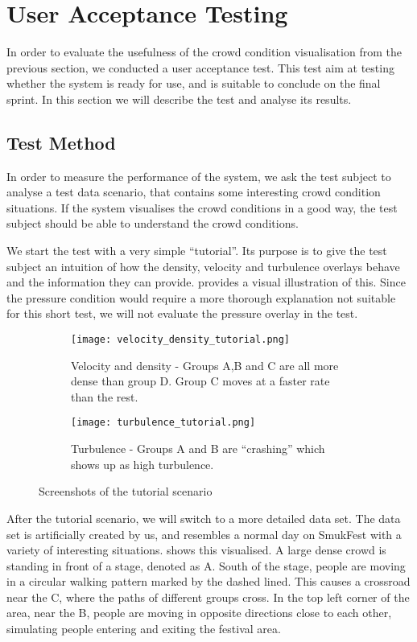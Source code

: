 \section{User Acceptance Testing} \label{sec:s4_test}

In order to evaluate the usefulness of the crowd condition visualisation from the previous section, we conducted a user acceptance test. This test aim at testing whether the system is ready for use, and is suitable to conclude on the final sprint. In this section we will describe the test and analyse its results.

\subsection{Test Method}

In order to measure the performance of the system, we ask the test subject to analyse a test data scenario, that contains some interesting crowd condition situations. If the system visualises the crowd conditions in a good way, the test subject should be able to understand the crowd conditions.

We start the test with a very simple \enquote{tutorial}. Its purpose is to give the test subject an intuition of how the density, velocity and turbulence overlays behave and the information they can provide.  provides a visual illustration of this. Since the pressure condition would require a more thorough explanation not suitable for this short test, we will not evaluate the pressure overlay in the test.

\begin{figure}[htbp]
\begin{subfigure}[t]{.49\linewidth}
    \centering
    \texttt{[image: velocity\_density\_tutorial.png]}
    \caption{Velocity and density - Groups A,B and C are all more dense than group D. Group C moves at a faster rate than the rest.}
\end{subfigure}
\enspace
\begin{subfigure}[t]{.49\linewidth}
    \centering
    \texttt{[image: turbulence\_tutorial.png]}
    \caption{Turbulence - Groups A and B are \enquote{crashing} which shows up as high turbulence.}
\end{subfigure}
\caption{Screenshots of the tutorial scenario}
\label{fig:tutorial_screens}
\end{figure}

After the tutorial scenario, we will switch to a more detailed data set. The data set is artificially created by us, and resembles a normal day on SmukFest with a variety of interesting situations.  shows this visualised. A large dense crowd is standing in front of a stage, denoted as A. South of the stage, people are moving in a circular walking pattern marked by the dashed lined. This causes a crossroad near the C, where the paths of different groups cross. In the top left corner of the area, near the B, people are moving in opposite directions close to each other, simulating people entering and exiting the festival area.

